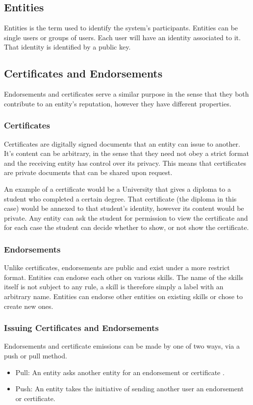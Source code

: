 \documentclass[llncsdoc]{llncs}
\begin{document}
\subsection{Entities}
Entities is the term used to identify the system's participants. Entities can be single users or groups of users. Each user will have an identity associated to it. That identity is identified by a public key.

\subsection{Certificates and Endorsements}
Endorsements and certificates serve a similar purpose in the sense that they both contribute to an entity's reputation, however they have different properties.

\subsubsection{Certificates}
Certificates are digitally signed documents that an entity can issue to another. It's content can be arbitrary, in the sense that they need not obey a strict format and the receiving entity has control over its privacy. This means that certificates are private documents that can be shared upon request.

An example of a certificate would be a University that gives a diploma to a student who completed a certain degree. That certificate (the diploma in this case) would be annexed to that student's identity, however its content would be private. Any entity can ask the student for permission to view the certificate and for each case the student can decide whether to show, or not show the certificate.

\subsubsection{Endorsements}
Unlike certificates, endorsements are public and exist under a more restrict format. Entities can endorse each other on various skills. The name of the skills itself is not subject to any rule, a skill is therefore simply a label with an arbitrary name. Entities can endorse other entities on existing skills or chose to create new ones.

\subsubsection{Issuing Certificates and Endorsements}
Endorsements and certificate emissions can be made by one of two ways, via a push or pull method.
\begin{itemize}
    \item Pull: An entity asks another entity for an endorsement or certificate .
    \item Push: An entity takes the initiative of sending another user an endorsement or certificate.
\end{itemize}
\end{document}
